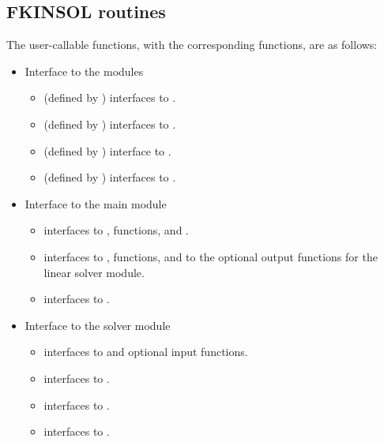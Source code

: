 \subsection{FKINSOL routines}

The user-callable functions, with the corresponding {\kinsol} functions,
are as follows:
\begin{itemize}

\item Interface to the {\nvector} modules

  \begin{itemize}
  \item {} (defined by {\nvecs}) 
    interfaces to .
  \item {} (defined by {\nvecp}) 
    interfaces to .
  \item {} (defined by {\nvecs})
    interface to .
  \item {}  (defined by {\nvecp})
    interfaces to .
  \end{itemize}

\item Interface to the main {\kinsol} module

  \begin{itemize}
  \item {}
    interfaces to ,  functions, and .
  \item {}
    interfaces to ,  functions, and to the optional
    output functions for the {\kinspgmr} linear solver module.
  \item {}    
    interfaces to .
  \end{itemize}  

\item Interface to the {\kinspgmr} solver module

  \begin{itemize}
  \item {}
    interfaces to  and {\spgmr} optional input functions.
  \item {}
   interfaces to .
 \item {}
   interfaces to .
 \item {}
   interfaces to .
 \end{itemize}

\end{itemize}

